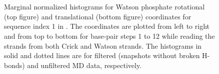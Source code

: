 \begin{figure}
\begin{center}
\\
 \\
\end{center}
\caption{Marginal normalized histograms for Watson phosphate rotational (top figure) and translational (bottom figure) coordinates for sequence index 1 in \Lbdna. The coordinates are plotted from left to right and from top to bottom for base-pair steps 1 to 12 while reading the strands from both Crick and Watson strands. 
The histograms in solid and dotted lines are for filtered (snapshots without broken H-bonds) and unfiltered MD data, respectively.
}
\label{c3:fig_hist_filter3}
\end{figure}\clearpage

